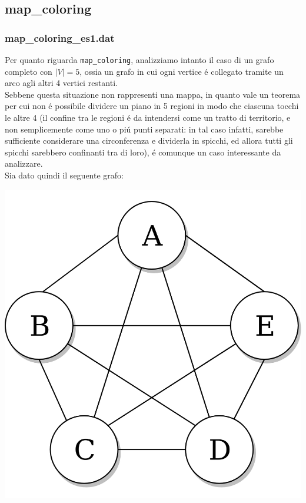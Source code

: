 \documentclass{article}
\begin{document}
\subsection{map\_coloring}
\subsubsection{map\_coloring\_es1.dat}

Per quanto riguarda \texttt{map\_coloring}, analizziamo intanto il caso di un grafo completo con $|V| = 5$, ossia un grafo in cui ogni vertice \'e collegato tramite un arco agli altri 4 vertici restanti. \\
Sebbene questa situazione non rappresenti una mappa, in quanto vale un teorema per cui non \'e possibile dividere un piano in 5 regioni in modo che ciascuna tocchi le altre 4 (il confine tra le regioni \'e da intendersi come un tratto di territorio, e non semplicemente come uno o pi\'u punti separati: in tal caso infatti, sarebbe sufficiente considerare una circonferenza e dividerla in spicchi, ed allora tutti gli spicchi sarebbero confinanti tra di loro), \'e comunque un caso interessante da analizzare.\\

Sia dato quindi il seguente grafo:\\

\begin{center}
\includegraphics[scale=0.15]{complete_graph.png}
\end{center}
\end{document}
